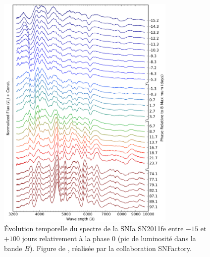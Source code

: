 \documentclass[../main/main.tex]{subfiles}
\begin{document}
\begin{figure}[ht]
  \centering
  \includegraphics[width=0.77\textwidth]{../figures/01bis_sne/sniaspecevol.pdf}
  \caption[\'Evolution temporelle du spectre de la SNIa
  SN2011fe.]{\'Evolution temporelle du spectre de la SNIa SN2011fe entre
  $-15$ et $+100$ jours relativement à la phase $0$ (pic de luminosité
  dans la bande $B$). Figure de \citet{Pereira2013}, réalisée par la
  collaboration SNFactory.}
  \label{fig:specevolsnia}
\end{figure}
\end{document}
